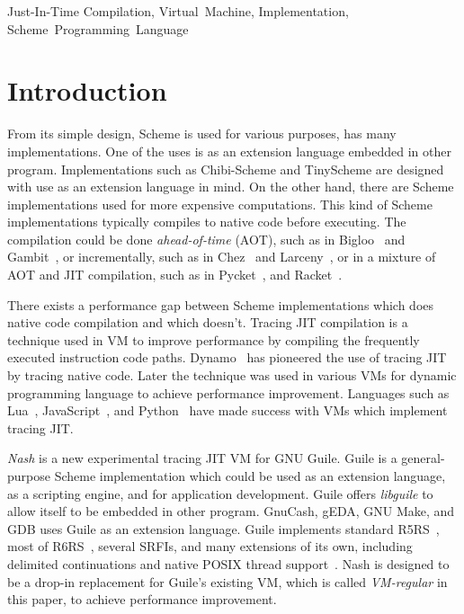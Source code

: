 \documentclass[preprint, 10pt]{sigplanconf}
\begin{document}
\keywords{} Just-In-Time Compilation, Virtual~Machine, Implementation,
Scheme~Programming~Language

\section{Introduction}

From its simple design, Scheme is used for various purposes, has many
implementations. One of the uses is as an extension language embedded in other
program. Implementations such as Chibi-Scheme and TinyScheme are designed with
use as an extension language in mind. On the other hand, there are Scheme
implementations used for more expensive computations. This kind of Scheme
implementations typically compiles to native code before executing. The
compilation could be done \textit{ahead-of-time} (AOT), such as in
Bigloo~\cite{serrano1995bigloo} and Gambit~\cite{feeley1998gambit}, or
incrementally, such as in Chez~\cite{dybvig2006development} and
Larceny~\cite{hansen1992impact}, or in a mixture of AOT and JIT compilation,
such as in Pycket~\cite{bauman2015pycket}, and Racket~\cite{flatt2013racket}.

There exists a performance gap between Scheme implementations which does
native code compilation and which doesn't. Tracing JIT compilation is a
technique used in VM to improve performance by compiling the frequently
executed instruction code paths. Dynamo~\cite{bala2000dynamo} has pioneered
the use of tracing JIT by tracing native code. Later the technique was used in
various VMs for dynamic programming language to achieve performance
improvement. Languages such as Lua~\cite{pall2016luajit},
JavaScript~\cite{gal2009trace}, and Python~\cite{bolz2009tracing} have made
success with VMs which implement tracing JIT.\@

\textit{Nash} is a new experimental tracing JIT VM for GNU Guile. Guile is a
general-purpose Scheme implementation which could be used as an extension
language, as a scripting engine, and for application development. Guile offers
\textit{libguile} to allow itself to be embedded in other program. GnuCash,
gEDA, GNU Make, and GDB uses Guile as an extension language. Guile implements
standard R5RS~\cite{abelson1998revised5}, most of
R6RS~\cite{sperber2010revised}, several SRFIs, and many extensions of its own,
including delimited continuations and native POSIX thread
support~\cite{Galassi02guilereference}. Nash is designed to be a drop-in
replacement for Guile's existing VM, which is called \textit{VM-regular} in
this paper, to achieve performance improvement.
\end{document}
